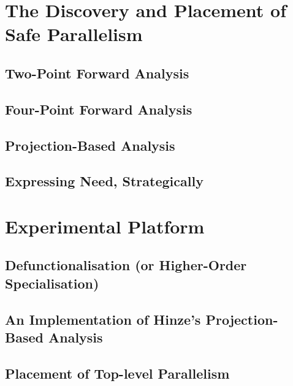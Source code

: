 \documentclass[justified, twoside, a4paper, symmetric]{tufte-book}
\begin{document}
\chapter{The Discovery and Placement of Safe Parallelism}

    

    \section{Two-Point Forward Analysis}
    \label{sec:twoPoint}

    \section{Four-Point Forward Analysis}
    \label{sec:fourPoint}

    \section{Projection-Based Analysis}
    \label{sec:projections}
    


    \section{Expressing Need, Strategically}
    \label{sec:derivations}
    
    
\chapter{Experimental Platform}

    

    \section{Defunctionalisation (or Higher-Order Specialisation)}
    \label{sec:defunctionalisation}
    

    \section{An Implementation of Hinze's Projection-Based Analysis}
    \label{sec:hinzeImplementation}
    
    \section{Placement of Top-level Parallelism}
    \label{sec:parPlacement}
    
\end{document}
